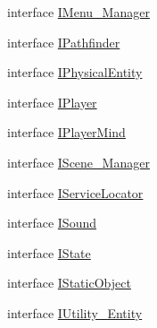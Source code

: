 \begin{DoxyCompactItemize}
\item 
interface \mbox{\hyperlink{interface_g_m_t_b_1_1_interfaces_1_1_i_menu___manager}{I\+Menu\+\_\+\+Manager}}
\item 
interface \mbox{\hyperlink{interface_g_m_t_b_1_1_interfaces_1_1_i_pathfinder}{I\+Pathfinder}}
\item 
interface \mbox{\hyperlink{interface_g_m_t_b_1_1_interfaces_1_1_i_physical_entity}{I\+Physical\+Entity}}
\item 
interface \mbox{\hyperlink{interface_g_m_t_b_1_1_interfaces_1_1_i_player}{I\+Player}}
\item 
interface \mbox{\hyperlink{interface_g_m_t_b_1_1_interfaces_1_1_i_player_mind}{I\+Player\+Mind}}
\item 
interface \mbox{\hyperlink{interface_g_m_t_b_1_1_interfaces_1_1_i_scene___manager}{I\+Scene\+\_\+\+Manager}}
\item 
interface \mbox{\hyperlink{interface_g_m_t_b_1_1_interfaces_1_1_i_service_locator}{I\+Service\+Locator}}
\item 
interface \mbox{\hyperlink{interface_g_m_t_b_1_1_interfaces_1_1_i_sound}{I\+Sound}}
\item 
interface \mbox{\hyperlink{interface_g_m_t_b_1_1_interfaces_1_1_i_state}{I\+State}}
\item 
interface \mbox{\hyperlink{interface_g_m_t_b_1_1_interfaces_1_1_i_static_object}{I\+Static\+Object}}
\item 
interface \mbox{\hyperlink{interface_g_m_t_b_1_1_interfaces_1_1_i_utility___entity}{I\+Utility\+\_\+\+Entity}}
\end{DoxyCompactItemize}
